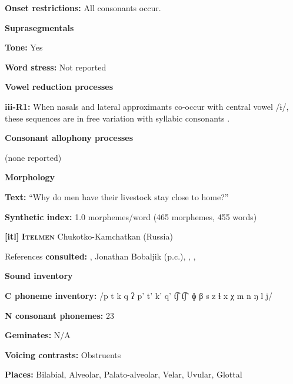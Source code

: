 \textbf{Onset restrictions:} All consonants occur.



\textbf{Suprasegmentals}



\textbf{Tone:} Yes



\textbf{Word stress:} Not reported



\textbf{Vowel reduction processes}



\textbf{iii-R1:} When nasals and lateral approximants co-occur with central vowel /ɨ/, these sequences are in free variation with syllabic consonants \citep[31]{Gerner2013}.



\textbf{Consonant allophony processes}



(none reported)



\textbf{Morphology}



\textbf{Text:} “Why do men have their livestock stay close to home?” \citep[525-530]{Gerner2013}



\textbf{Synthetic index:} 1.0 morphemes/word (465 morphemes, 455 words)



\textbf{[itl]}   \textbf{\textsc{Itelmen}}  Chukotko-Kamchatkan (Russia)



References \textbf{consulted:} \citet{Bobaljik2006}, Jonathan Bobaljik (p.c.), \citet{GeorgVolodin1999}, \citet{Volodin1976}, \citet{VolodinZhukova1968}



\textbf{Sound inventory}



\textbf{C phoneme inventory:} /p t k q ʔ p’ t’ k’ q’ t͡ʃ t͡ʃ’ ɸ β s z ɬ x χ m n ŋ l j/



\textbf{N consonant phonemes:} 23



\textbf{Geminates:} N/A



\textbf{Voicing contrasts:} Obstruents



\textbf{Places:} Bilabial, Alveolar, Palato-alveolar, Velar, Uvular, Glottal



